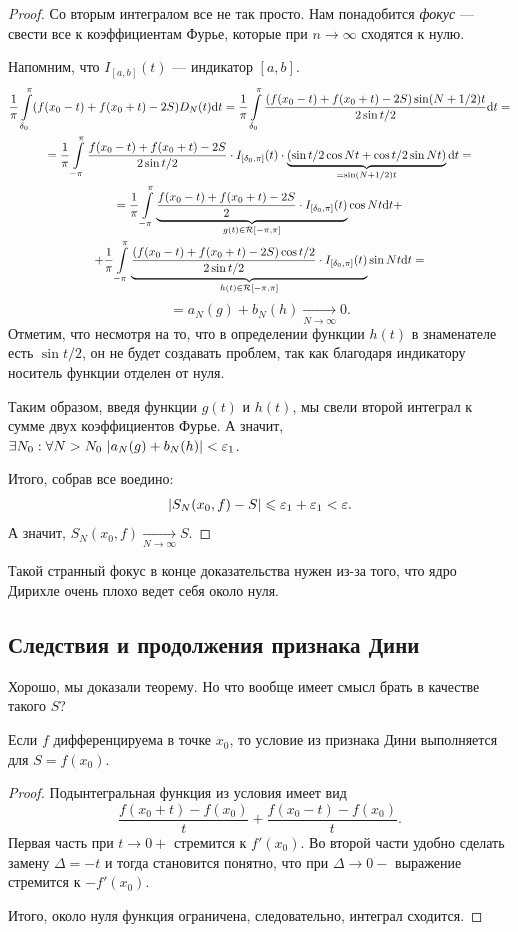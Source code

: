 \begin{proof}
Со вторым интегралом все не так просто. Нам понадобится \textit{фокус} --- свести все к коэффициентам Фурье, которые при $n\to \infty$ сходятся к нулю.

Напомним, что $I_{[a, b]}(t)$ --- индикатор $[a, b]$.
\begin{multline}
\dfrac{1}{\pi} \int\limits_{\delta_0}^{\pi} (f(x_0 - t) + f(x_0 + t) - 2S)D_N(t)\mathrm{d} t =  \dfrac{1}{\pi} \int\limits_{\delta_0}^{\pi} \dfrac{(f(x_0 - t) + f(x_0 + t) - 2S) \sin (N + 1/2)t}{2 \sin t/2} \mathrm{d} t = \\ 
= \dfrac{1}{\pi} \int\limits_{-\pi}^{\pi} \dfrac{f(x_0 - t) + f(x_0 + t) - 2S}{2 \sin t/2} \cdot I_{[\delta_0, \pi]}(t) \cdot \underbrace{(\sin t/2 \cos Nt + \cos t/2 \sin Nt)}_{=\sin(N + 1/2)t}\mathrm{d} t =
\\
= \dfrac{1}{\pi} \int\limits_{-\pi}^{\pi} \underbrace{\dfrac{f(x_0 - t) + f(x_0 + t) - 2S}{2} \cdot I_{[\delta_0, \pi]}(t)}_{g(t) \in \mathcal{R}[-\pi, \pi]} \cos Nt \mathrm{d} t + \\ + \dfrac{1}{\pi} \int\limits_{-\pi}^{\pi} \underbrace{\dfrac{(f(x_0 - t) + f(x_0 + t) - 2S)\cos t/2}{2\sin t/2} \cdot I_{[\delta_0, \pi]}(t)}_{h(t) \in \mathcal{R}[-\pi, \pi]} \sin Nt \mathrm{d} t =
\end{multline}
$$
= a_N(g) + b_N(h) \underset{N\to \infty}{\longrightarrow} 0.
$$
Отметим, что несмотря на то, что в определении функции $h(t)$ в знаменателе есть $\sin t/2$, он не будет создавать проблем, так как благодаря индикатору носитель функции отделен от нуля.

Таким образом, введя функции $g(t)$ и $h(t)$, мы свели второй интеграл к сумме двух коэффициентов Фурье. А значит, $\exists N_0: \forall N > N_0\ |a_N(g) + b_N(h)| < \varepsilon_1$.

Итого, собрав все воедино:
\begin{gather*}
|S_N(x_0, f) - S| \leqslant \varepsilon_1 + \varepsilon_1 < \varepsilon.
\end{gather*}
А значит, $S_N(x_0, f) \underset{N\to \infty}{\longrightarrow} S$.
\end{proof}
\begin{Comment}
Такой странный фокус в конце доказательства нужен из-за того, что ядро Дирихле очень плохо ведет себя около нуля.
\end{Comment}
\subsection{Следствия и продолжения признака Дини}
Хорошо, мы доказали теорему. Но что вообще имеет смысл брать в качестве такого $S$?
\begin{Comment}
Если $f$ дифференцируема в точке $x_0$, то условие из признака Дини выполняется для $S = f(x_0)$.
\end{Comment}
\begin{proof}
Подынтегральная функция из условия имеет вид 
$$
\dfrac{f(x_0 + t) - f(x_0)}{t} + \dfrac{f(x_0 - t) - f(x_0)}{t}.
$$
Первая часть при $t \to 0+$ стремится к $f'(x_0)$. Во второй части удобно сделать замену $\Delta = -t$ и тогда становится понятно, что при $\Delta \to 0-$ выражение стремится к $-f'(x_0)$.

Итого, около нуля функция ограничена, следовательно, интеграл сходится.
\end{proof}

